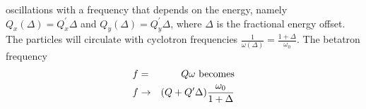 \documentclass[10pt]{report}
\begin{document}
oscillations with a frequency that depends on the energy, namely $Q_x(\Delta) = Q^\prime_x\Delta$
and $Q_y(\Delta) = Q_y^\prime \Delta$, where $\Delta$ is the fractional energy offset. 
The particles will circulate with cyclotron frequencies
$\frac{1}{\omega(\Delta)} = \frac{1+\Delta}{\omega_0}$.
The betatron frequency
\begin{eqnarray*}
f &=& Q\omega \ {\rm becomes} \\
f &\rightarrow& (Q+Q^\prime\Delta)\frac{\omega_0}{1+\Delta}\\  
\end{eqnarray*}

\end{document}
